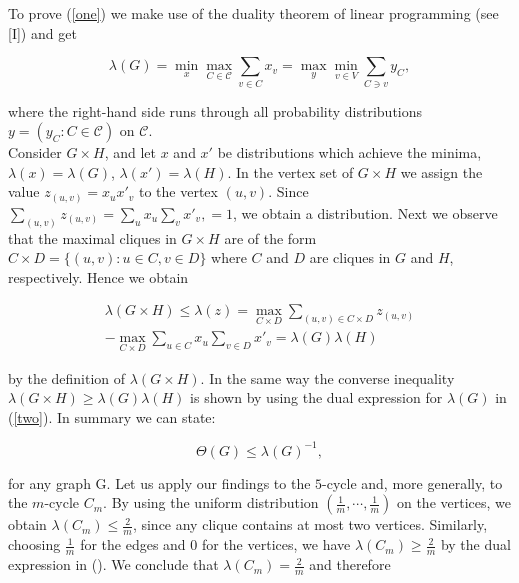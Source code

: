 \documentclass[12pt]{memoir}
\newcommand{\setsecondpagemargins}{
    \clearpage
    \setulmarginsandblock{2cm}{0.5cm}{*}
    \checkandfixthelayout
}
\begin{document}
To prove (\ref{one}) we make use of the duality theorem of linear programming 
(see [I]) and get

\begin{equation}
  \lambda(G) = \min_x\max_{C \in \mathcal{C}} \sum_{v\in C} x_v = \max_y\min_{v \in V}\sum_{C \ni v}y_C, \label{two}
\end{equation}

where the right-hand side runs through all probability distributions $y = (y_C : C \in \mathcal{C})$
on $\mathcal{C}$.\\
Consider $G \times H$, and let $x$ and $x'$ be distributions which achieve the 
minima, $\lambda(x) = \lambda(G)$, $\lambda(x') = \lambda(H)$. In the vertex set of $G \times H$ we 
assign the value $z_{(u,v)} = x_ux'_v$ to the vertex $(u, v)$. Since $\sum_{(u,v)}z_{(u,v)} = \sum_u x_u \sum_v x'_v, = 1$, 
we obtain a distribution. Next we observe that the maximal cliques in 
$G \times H$ are of the form $C \times D = \{(u, v) : u \in C, v \in D \} $
where $C$ and $D$ are cliques in $G$ and $H$, respectively. Hence we obtain 

\begin{equation*}
  \begin{align}
  \lambda(G \times H) \leq \lambda(z) = \max_{C \times D} \sum_{(u,v) \in C \times D} z_(u,v)\\
  - \max_{C \times D} \sum_{u\in C} x_u \sum_{v \in D} x'_v = \lambda(G)\lambda(H)
  \end{align}
\end{equation*}

\setsecondpagemargins

by the definition of $\lambda(G \times H)$. In the same way the converse inequality 
$\lambda(G \times H) \geq \lambda(G)\lambda(H)$ is shown by using the dual expression for $\lambda(G)$ 
in (\ref{two}). In summary we can state: 

\begin{equation*}
  \Theta(G) \leq \lambda(G)^{-1},
\end{equation*}

for any graph G.
Let us apply our findings to the $5$-cycle and, more generally, to the $m$-cycle $C_m$.
By using the uniform distribution $(\frac{1}{m},\dotsb,\frac{1}{m})$ on the 
vertices, we obtain $\lambda(C_m) \leq \frac{2}{m} $, since any clique contains at most two 
vertices. Similarly, choosing $\frac{1}{m}$ for the edges and $0$ for the vertices, we have 
$\lambda(C_m) \geq \frac{2}{m}$ by the dual expression in (). We conclude that $\lambda(C_m) = \frac{2}{m}$ 
and therefore 
\end{document}
